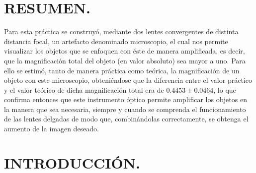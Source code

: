 \documentclass[10pt,a4paper]{article}
\begin{document}
\portada

\section{RESUMEN.} %
Para esta práctica se construyó, mediante dos lentes convergentes de distinta distancia focal, un artefacto denominado microscopio, el cual nos permite visualizar los objetos que se enfoquen con éste de manera amplificada, es decir, que la magnificación total del objeto (en valor absoluto) sea mayor a uno. Para ello se estimó, tanto de manera práctica como teórica, la magnificación de un objeto con este microscopio, obteniéndose que la diferencia entre el valor práctico y el valor teórico de dicha magnificación total era de $0.4453\pm 0.0464$, lo que confirma entonces que este instrumento óptico permite amplificar los objetos en la manera que sea necesaria, siempre y cuando se comprenda el funcionamiento de las lentes delgadas de modo que, combinándolas correctamente, se obtenga el aumento de la imagen deseado.

\section{INTRODUCCIÓN.} %
\end{document}
